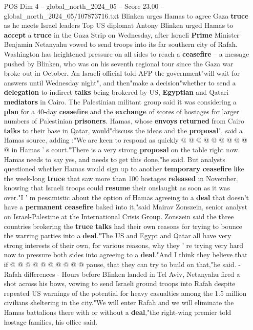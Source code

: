 \begin{textsample}{POS Dim 4 – global\_north\_2024\_05 – Score 23.00 – global\_north\_2024\_05/107873716.txt}  \label{ex:f4_pos_332}
Blinken urges Hamas to agree Gaza \textbf{truce} as he meets Israel leaders Top US diplomat Antony Blinken urged Hamas to \textbf{accept} a \textbf{truce} in the Gaza Strip on Wednesday, after Israeli \textbf{Prime} Minister Benjamin Netanyahu vowed to send troops into its far southern city of Rafah.
Washington has heightened pressure on all sides to reach a \textbf{ceasefire} -- a message pushed by Blinken, who was on his seventh regional tour since the Gaza war broke out in October.
An Israeli official told AFP the government"will wait for answers until Wednesday night", and then"make a decision"whether to send a \textbf{delegation} to indirect \textbf{talks} being brokered by US, \textbf{Egyptian} and Qatari \textbf{mediators} in Cairo.
The Palestinian militant group said it was considering a \textbf{plan} for a 40-day \textbf{ceasefire} and the \textbf{exchange} of scores of hostages for larger numbers of Palestinian \textbf{prisoners}.
Hamas, whose \textbf{envoys} \textbf{returned} from Cairo \textbf{talks} to their base in Qatar, would"discuss the ideas and the \textbf{proposal}", said a Hamas source, adding :"We are keen to respond as quickly @ @ @ @ @ @ @ @ @ @ in Hamas ' s court."There is a very strong \textbf{proposal} on the table right now.
Hamas needs to say yes, and needs to get this done,"he said.
But analysts questioned whether Hamas would sign up to another \textbf{temporary} \textbf{ceasefire} like the week-long \textbf{truce} that saw more than 100 hostages \textbf{released} in November, knowing that Israeli troops could \textbf{resume} their onslaught as soon as it was over."I ' m pessimistic about the option of Hamas agreeing to a \textbf{deal} that doesn't have a \textbf{permanent} \textbf{ceasefire} baked into it,"said Mairav Zonszein, senior analyst on Israel-Palestine at the International Crisis Group.
Zonszein said the three countries brokering the \textbf{truce} \textbf{talks} had their own reasons for trying to bounce the warring parties into a \textbf{deal}."The US and Egypt and Qatar all have very strong interests of their own, for various reasons, why they ' re trying very hard now to pressure both sides into agreeing to a \textbf{deal}."And I think they believe that if @ @ @ @ @ @ @ @ @ @ pause, that they can try to build on that,"he said. - Rafah differences - Hours before Blinken landed in Tel Aviv, Netanyahu fired a shot across his bows, vowing to send Israeli ground troops into Rafah despite repeated US warnings of the potential for heavy casualties among the 1.5 million civilians sheltering in the city."We will enter Rafah and we will eliminate the Hamas battalions there with or without a \textbf{deal},"the right-wing premier told hostage families, his office said.

\end{textsample}
